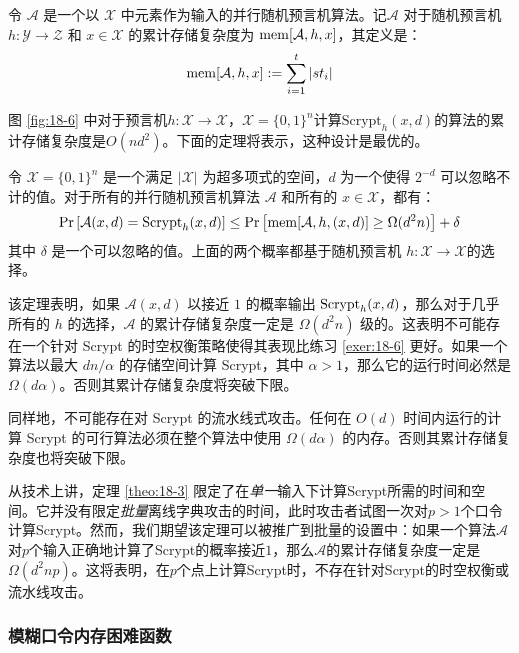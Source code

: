 \begin{definition}
	令 $\mathcal{A}$ 是一个以 $\mathcal{X}$ 中元素作为输入的并行随机预言机算法。记$\mathcal{A}$ 对于随机预言机 $h:\mathcal{Y}\to\mathcal{Z}$ 和 $x\in\mathcal{X}$ 的累计存储复杂度为 ${\rm mem}[\mathcal{A},h,x]$，其定义是：
	\[
	{\rm mem}[\mathcal{A},h,x]:=\sum_{i=1}^t|st_i|
	\]
\end{definition}

图 \ref{fig:18-6} 中对于预言机$h:\mathcal{X}\to\mathcal{X}$，$\mathcal{X}=\{0,1\}^n$计算$\text{Scrypt}_h(x,d)$的算法的累计存储复杂度是$O(nd^2)$。下面的定理将表示，这种设计是最优的。

\begin{theorem}\label{theo:18-3}
	令 $\mathcal{X}=\{0,1\}^n$ 是一个满足 $|\mathcal{X}|$ 为超多项式的空间，$d$ 为一个使得 $2^{-d}$ 可以忽略不计的值。对于所有的并行随机预言机算法 $\mathcal{A}$ 和所有的 $x\in\mathcal{X}$，都有：
	\[
	  {\rm Pr}
	  \left[
	    \mathcal{A}(x,d)={\rm Scrypt}_h(x,d)
	  \right]
      \leq
      {\rm Pr}
      \left[
      {\rm mem}[\mathcal{A},h,(x,d)]\geq\Omega(d^2n)
      \right]+\delta
    \]
    其中 $\delta$ 是一个可以忽略的值。上面的两个概率都基于随机预言机 $h:\mathcal{X}\to\mathcal{X}$的选择。
\end{theorem}

该定理表明，如果 $\mathcal{A}(x,d)$ 以接近 $1$ 的概率输出 ${\rm Scrypt}_h(x,d)$，那么对于几乎所有的 $h$ 的选择，$\mathcal{A}$ 的累计存储复杂度一定是 $\Omega(d^2n)$ 级的。这表明不可能存在一个针对 Scrypt 的时空权衡策略使得其表现比练习 \ref{exer:18-6} 更好。如果一个算法以最大 ${dn}/{\alpha}$ 的存储空间计算 Scrypt，其中 $\alpha>1$，那么它的运行时间必然是 $\Omega(d\alpha)$。否则其累计存储复杂度将突破下限。

同样地，不可能存在对 Scrypt 的流水线式攻击。任何在 $O(d)$ 时间内运行的计算 Scrypt 的可行算法必须在整个算法中使用 $\Omega(d\alpha)$ 的内存。否则其累计存储复杂度也将突破下限。

从技术上讲，定理 \ref{theo:18-3} 限定了在\emph{单一}输入下计算Scrypt所需的时间和空间。它并没有限定\emph{批量}离线字典攻击的时间，此时攻击者试图一次对$p>1$个口令计算Scrypt。然而，我们期望该定理可以被推广到批量的设置中：如果一个算法$\mathcal{A}$对$p$个输入正确地计算了Scrypt的概率接近$1$，那么$\mathcal{A}$的累计存储复杂度一定是$\Omega(d^2np)$。这将表明，在$p$个点上计算Scrypt时，不存在针对Scrypt的时空权衡或流水线攻击。

\subsubsection{模糊口令内存困难函数}

